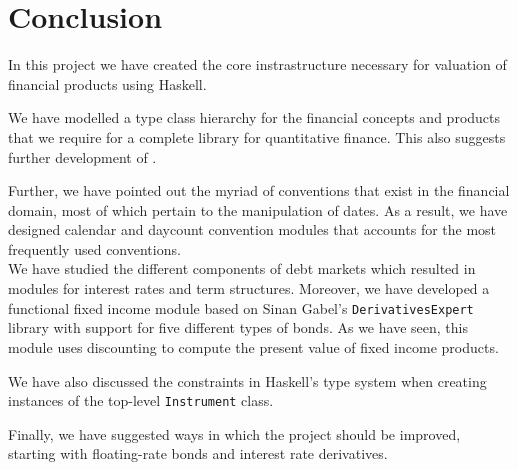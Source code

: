 \chapter{Conclusion}

In this project we have created the core instrastructure necessary for 
valuation of financial products using Haskell. 

We have modelled a type class hierarchy
for the financial concepts and products that we require for a complete
library for quantitative finance. This also suggests further development
of \hql.

Further, we have pointed out the myriad of conventions that exist in
the financial domain, most of which pertain to the manipulation of dates.
As a result, we have designed calendar and daycount convention modules
that accounts for the most frequently used conventions.\\

We have studied the different components of debt markets which resulted
in modules for interest rates and term structures.
Moreover, we have developed a functional fixed income module based on
Sinan Gabel's \texttt{DerivativesExpert} library with support for five
different types of bonds. As we have seen, this module uses discounting
to compute the present value of fixed income products.

We have also discussed the constraints in Haskell's type system when
creating instances of the top-level \texttt{Instrument} class.

Finally, we have suggested ways in which the \hql project should be improved,
starting with floating-rate bonds and interest rate derivatives.
